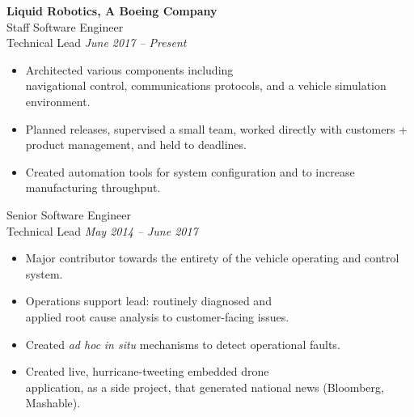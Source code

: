 \documentclass[11pt, twoside, a4paper]{article}
\begin{document}
{\begin{multicols}{2}
\begin{itemize}
                \end{itemize}
                \vspace{10px}
                \textbf{Liquid Robotics, A Boeing Company}\\
                Staff Software Engineer\\
                Technical Lead \hfill \textsl{June 2017 -- Present} \\
                \vspace{ -10px}
                \begin{itemize}[noitemsep,nolistsep]
                    \item Architected various components including \\navigational control, communications protocols, and a vehicle simulation environment.
                    \item Planned releases, supervised a small team, worked directly with customers + product management, and held to deadlines.
                    \item Created automation tools for system configuration and to increase manufacturing throughput.
                \end{itemize}
                \vspace{10px}
                Senior Software Engineer\\
                Technical Lead \hfill \textsl{May 2014 -- June 2017} \\
                \vspace{ -10px}
                \begin{itemize}[noitemsep,nolistsep]
                	\item Major contributor towards the entirety of the vehicle operating and control system.
                     \item Operations support lead: routinely diagnosed and \\applied root cause analysis to customer-facing issues.
                     \item Created \textit{ad hoc} \textit{in situ} mechanisms to detect operational faults. 
                     \item Created live, hurricane-tweeting embedded drone \\application, as a side project, that generated national news (Bloomberg, Mashable).

\end{itemize}
\end{multicols}}
\end{document}
